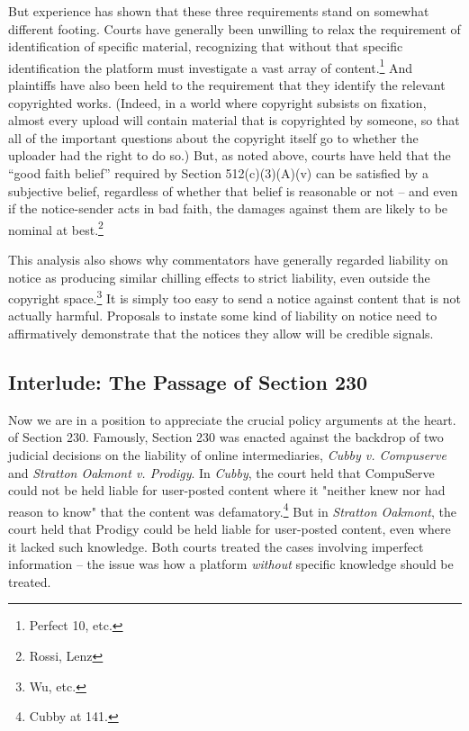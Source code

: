 But experience has shown that these three requirements stand on somewhat different footing. Courts have generally been unwilling to relax the requirement of identification of specific material, recognizing that without that specific identification the platform must investigate a vast array of content.\footnote{Perfect 10, etc.} And plaintiffs have also been held to the requirement that they identify the relevant copyrighted works. (Indeed, in a world where copyright subsists on fixation, almost every upload will contain material that is copyrighted by someone, so that all of the important questions about the copyright itself go to whether the uploader had the right to do so.) But, as noted above, courts have held that the ``good faith belief'' required by Section 512(c)(3)(A)(v) can be satisfied by a subjective belief, regardless of whether that belief is reasonable or not -- and even if the notice-sender acts in bad faith, the damages against them are likely to be nominal at best.\footnote{Rossi, Lenz} 

This analysis also shows why commentators have generally regarded liability on notice as producing similar chilling effects to strict liability, even outside the copyright space.\footnote{Wu, etc.} It is simply too easy to send a notice against content that is not actually harmful. Proposals to instate some kind of liability on notice need to affirmatively demonstrate that the notices they allow will be credible signals.


\subsection{Interlude: The Passage of Section 230}
\label{sec:passage}

Now we are in a position to appreciate the crucial policy arguments at the heart. of Section 230. Famously, Section 230 was enacted against the backdrop of two judicial decisions on the liability of online intermediaries, \emph{Cubby v. Compuserve} and \emph{Stratton Oakmont v. Prodigy}. In \emph{Cubby}, the court held that CompuServe could not be held liable for user-posted content where it "neither knew nor had reason to know" that the content was defamatory.\footnote{Cubby at 141.} But in \emph{Stratton Oakmont}, the court held that Prodigy could be held liable for user-posted content, even where it lacked such knowledge. Both courts treated the cases involving imperfect information -- the issue was how a platform \emph{without} specific knowledge should be treated.

